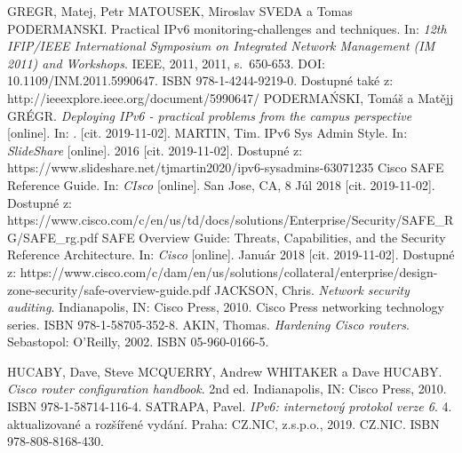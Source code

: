 \begin{literatura}{99}
GREGR, Matej, Petr MATOUSEK, Miroslav SVEDA a Tomas PODERMANSKI. Practical IPv6 monitoring-challenges and techniques. In: \textit{12th IFIP/IEEE International Symposium on Integrated Network Management (IM 2011) and Workshops}. IEEE, 2011, 2011, s.~650-653. DOI: 10.1109/INM.2011.5990647. ISBN 978-1-4244-9219-0. Dostupné také z: http://ieeexplore.ieee.org/document/5990647/
PODERMAŃSKI, Tomáš a Matějj GRÉGR. \textit{Deploying IPv6 - practical problems from the campus perspective} [online]. In: . [cit. 2019-11-02].
MARTIN, Tim. IPv6 Sys Admin Style. In: \textit{SlideShare} [online]. 2016 [cit. 2019-11-02]. Dostupné z: https://www.slideshare.net/tjmartin2020/ipv6-sysadmins-63071235
Cisco SAFE Reference Guide. In: \textit{CIsco} [online]. San Jose, CA, 8 Júl 2018 [cit. 2019-11-02]. Dostupné z: https://www.cisco.com/c/en/us/td/docs/solutions/Enterprise/Security/SAFE\_RG/SAFE\_rg.pdf
SAFE Overview Guide: Threats, Capabilities, and the Security Reference Architecture. In: \textit{Cisco} [online]. Január 2018 [cit. 2019-11-02]. Dostupné z: https://www.cisco.com/c/dam/en/us/solutions/collateral/enterprise/design-zone-security/safe-overview-guide.pdf
JACKSON, Chris. \textit{Network security auditing}. Indianapolis, IN: Cisco Press, 2010. Cisco Press networking technology series. ISBN 978-1-58705-352-8.
AKIN, Thomas. \textit{Hardening Cisco routers}. Sebastopol: O'Reilly, 2002. ISBN 05-960-0166-5.

HUCABY, Dave, Steve MCQUERRY, Andrew WHITAKER a Dave HUCABY. \textit{Cisco router configuration handbook}. 2nd ed. Indianapolis, IN: Cisco Press, 2010. ISBN 978-1-58714-116-4.
SATRAPA, Pavel. \textit{IPv6: internetový protokol verze 6}. 4. aktualizované a rozšířené vydání. Praha: CZ.NIC, z.s.p.o., 2019. CZ.NIC. ISBN 978-808-8168-430.



\end{literatura}


%
%
%
